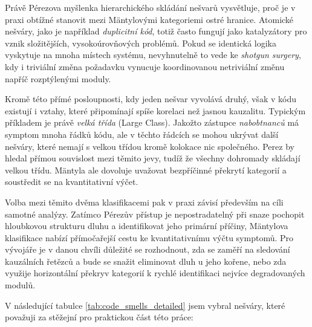 \documentclass[FM,DP,fonts]{tulthesis}
\begin{document}
Právě Pérezova myšlenka hierarchického skládání nešvarů vysvětluje, proč je v praxi obtížné stanovit mezi Mäntylovými kategoriemi ostré hranice. Atomické nešváry, jako je například \textit{duplicitní kód}, totiž často fungují jako katalyzátory pro vznik složitějších, vysokoúrovňových problémů. Pokud se identická logika vyskytuje na mnoha místech systému, nevyhnutelně to vede ke \textit{shotgun surgery}, kdy i triviální změna požadavku vynucuje koordinovanou netriviální změnu napříč rozptýlenými moduly.

Kromě této přímé posloupnosti, kdy jeden nešvar vyvolává druhý, však v kódu existují i vztahy, které připomínají spíše korelaci než jasnou kauzalitu. Typickým příkladem je právě \textit{velká třída} (Large Class). Jakožto zástupce \textit{nabobtnanců} má symptom mnoha řádků kódu, ale v těchto řádcích se mohou ukrývat další nešváry, které nemají s velkou třídou kromě kolokace nic společného. Perez by hledal přímou souvislost mezi těmito jevy, tudíž že všechny dohromady skládají velkou třídu. Mäntyla ale dovoluje uvažovat bezpříčinné překrytí kategorií a soustředit se na kvantitativní výčet.

Volba mezi těmito dvěma klasifikacemi pak v praxi závisí především na cíli samotné analýzy. Zatímco Pérezův přístup je nepostradatelný při snaze pochopit hloubkovou strukturu dluhu a identifikovat jeho primární příčiny, Mäntylova klasifikace nabízí přímočařejší cestu ke kvantitativnímu výčtu symptomů. Pro vývojáře je v danou chvíli důležité se rozhodnout, zda se zaměří na sledování kauzálních řetězců a bude se snažit eliminovat dluh u jeho kořene, nebo zda využije horizontální překryv kategorií k rychlé identifikaci nejvíce degradovaných modulů.

V následující tabulce \ref{tab:code_smells_detailed} jsem vybral nešváry, které považuji za stěžejní pro praktickou část této práce:
\end{document}
